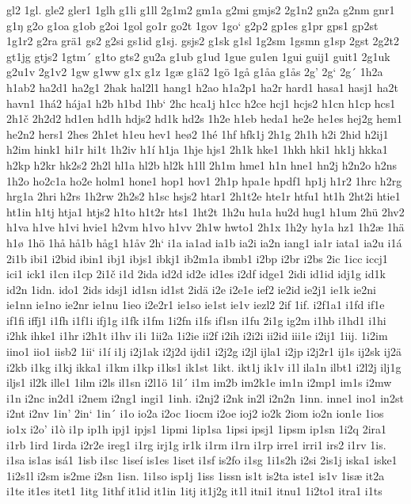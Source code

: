 gl2
1gl.
gle2
gler1
1glh
g1li
g1ll
2g1m2
gm1a
g2mi
gmjs2
2g1n2
gn2a
g2nm
gnr1
g1ŋ
g2o
g1oa
g1ob
g2oi
1gol
go1r
go2t
1gov
1go`
g2p2
gp1es
g1pr
gps1
gp2st
1g1r2
g2ra
grä1
gs2
g2si
gs1id
g1sj.
gsjs2
g1sk
g1sl
1g2sm
1gsmn
g1sp
2gst
2g2t2
gt1jg
gtjs2
1gtm´
g1to
gts2
gu2a
g1ub
g1ud
1gue
gu1en
1gui
guij1
guit1
2g1uk
g2u1v
2g1v2
1gw
g1ww
g1x
g1z
1gæ
g1ä2
1gö
1gå
g1åa
g1ås
2g'
2g`
2g´
1h2a
h1ab2
ha2d1
ha2g1
2hak
hal2l1
hang1
h2ao
h1a2p1
ha2r
hard1
hasa1
hasj1
ha2t
havn1
1há2
hája1
h2b
h1bd
1hb`
2hc
hca1j
h1cc
h2ce
hcj1
hcjs2
h1cn
h1cp
hcs1
2h1č
2h2d2
hd1en
hd1h
hdjs2
hd1k
hd2s
1h2e
h1eb
heda1
he2e
he1es
hej2g
hem1
he2n2
hers1
2hes
2h1et
h1eu
hev1
heø2
1hé
1hf
hfk1j
2h1g
2h1h
h2i
2hid
h2ij1
h2im
hink1
hi1r
hi1t
1h2iv
h1í
h1ja
1hje
hjs1
2h1k
hke1
1hkh
hki1
hk1j
hkka1
h2kp
h2kr
hk2s2
2h2l
hl1a
hl2b
hl2k
h1ll
2h1m
hme1
h1n
hne1
hn2j
h2n2o
h2ns
1h2o
ho2c1a
ho2e
holm1
hone1
hop1
hov1
2h1p
hpa1e
hpdf1
hp1j
h1r2
1hrc
h2rg
hrg1a
2hri
h2rs
1h2rw
2h2s2
h1sc
hsjs2
htar1
2h1t2e
hte1r
htfu1
ht1h
2ht2i
htie1
ht1in
h1tj
htja1
htjs2
h1to
h1t2r
hts1
1ht2t
1h2u
hu1a
hu2d
hug1
h1um
2hü
2hv2
h1va
h1ve
h1vi
hvie1
h2vm
h1vo
h1vv
2h1w
hwto1
2h1x
1h2y
hy1a
hz1
1h2æ
1hä
h1ø
1hö
1hå
hå1b
håg1
h1åv
2h`
i1a
ia1ad
ia1b
ia2i
ia2n
iang1
ia1r
iata1
ia2u
i1á
2i1b
ibi1
i2bid
ibin1
ibj1
ibjs1
ibkj1
ib2m1a
ibmb1
i2bp
i2br
i2bs
2ic
1icc
iccj1
ici1
ick1
i1cn
i1cp
2i1č
i1d
2ida
id2d
id2e
id1es
i2df
idge1
2idi
id1id
idj1g
id1k
id2n
1idn.
ido1
2ids
idsj1
id1sn
id1st
2idä
i2e
i2e1e
ief2
ie2id
ie2j1
ie1k
ie2ni
ie1nn
ie1no
ie2nr
ie1nu
1ieo
i2e2r1
ie1so
ie1st
ie1v
iezl2
2if
1if.
i2f1a1
i1fd
if1e
if1fi
iffj1
i1fh
i1f1i
ifj1g
i1fk
i1fm
1i2fn
i1fs
if1sn
i1fu
2i1g
ig2m
i1hb
i1hd1
i1hi
i2hk
ihke1
i1hr
i2h1t
i1hv
i1i
1ii2a
1i2ie
ii2f
i2ih
i2i2i
ii2id
iii1e
i2ij1
1iij.
1i2im
iino1
iio1
iisb2
1ii`
i1í
i1j
i2j1ak
i2j2d
ijdi1
i2j2g
i2jl
ijla1
i2jp
i2j2r1
ij1s
ij2sk
ij2ä
i2kb
i1kg
i1kj
ikka1
i1km
i1kp
i1ks1
ik1st
1ikt.
ikt1j
ik1v
i1l
ila1n
ilbt1
i2l2j
ilj1g
iljs1
il2k
ille1
1ilm
i2ls
il1sn
i2l1ö
1il´
i1m
im2b
im2k1e
im1n
i2mp1
im1s
i2mw
i1n
i2nc
in2d1
i2nem
i2ng1
ingi1
1inh.
i2nj2
i2nk
in2l
i2n2n
1inn.
inne1
ino1
in2st
i2nt
i2nv
1in'
2in`
1in´
i1o
io2a
i2oc
1iocm
i2oe
ioj2
io2k
2iom
io2n
ion1e
1ios
io1x
i2o'
i1ò
i1p
ip1h
ipj1
ipjs1
1ipmi
1ip1sa
1ipsi
ipsj1
1ipsm
ip1sn
1i2q
2ira1
i1rb
1ird
1irda
i2r2e
ireg1
i1rg
irj1g
ir1k
i1rm
i1rn
i1rp
irre1
irri1
irs2
i1rv
1is.
i1sa
is1as
isá1
1isb
i1sc
1iseí
is1es
1iset
i1sf
is2fo
i1sg
1i1s2h
i2si
2is1j
iska1
iske1
1i2s1l
i2sm
is2me
i2sn
1isn.
1i1so
isp1j
1iss
1issn
is1t
is2ta
iste1
is1v
1isæ
it2a
i1te
it1es
itet1
1itg
1ithf
it1id
it1in
1itj
it1j2g
it1l
itni1
itnu1
1i2to1
itra1
i1ts
